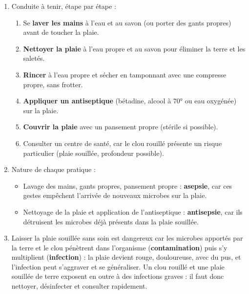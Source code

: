 \documentclass[11pt]{article}
\begin{document}
\begin{corrige}
\begin{enumerate}
\item Conduite à tenir, étape par étape :
\begin{enumerate}
\item Se \textbf{laver les mains} à l'eau et au savon (ou porter des gants propres) avant de toucher la plaie.
\item \textbf{Nettoyer la plaie} à l'eau propre et au savon pour éliminer la terre et les saletés.
\item \textbf{Rincer} à l'eau propre et sécher en tamponnant avec une compresse propre, sans frotter.
\item \textbf{Appliquer un antiseptique} (bétadine, alcool à 70° ou eau oxygénée) sur la plaie.
\item \textbf{Couvrir la plaie} avec un pansement propre (stérile si possible).
\item Consulter un centre de santé, car le clou rouillé présente un risque particulier (plaie souillée, profondeur possible).
\end{enumerate}
\item Nature de chaque pratique :
\begin{itemize}
\item Lavage des mains, gants propres, pansement propre : \textbf{asepsie}, car ces gestes empêchent l'arrivée de nouveaux microbes sur la plaie.
\item Nettoyage de la plaie et application de l'antiseptique : \textbf{antisepsie}, car ils détruisent les microbes déjà présents dans la plaie souillée.
\end{itemize}
\item Laisser la plaie souillée sans soin est dangereux car les microbes apportés par la terre et le clou pénètrent dans l'organisme (\textbf{contamination}) puis s'y multiplient (\textbf{infection}) : la plaie devient rouge, douloureuse, avec du pus, et l'infection peut s'aggraver et se généraliser. Un clou rouillé et une plaie souillée de terre exposent en outre à des infections graves : il faut donc nettoyer, désinfecter et consulter rapidement.
\end{enumerate}
\end{corrige}
\end{document}
